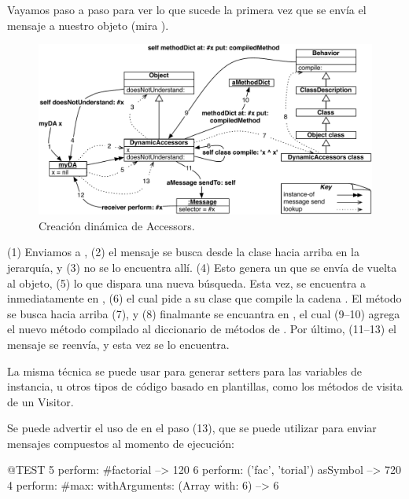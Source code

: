 \documentclass[a4paper,10pt,twoside]{book}
\begin{document}
Vayamos paso a paso para ver lo que sucede la primera vez que se envía
el mensaje  a nuestro objeto (mira ).

\begin{figure}[ht]\centering
        \includegraphics[width=\linewidth]{DynamicAccessors}
        \caption{Creaci\'on din\'amica de Accessors.}
\end{figure}

(1) Enviamos  a , (2) el mensaje se busca desde la
clase hacia arriba en la jerarquía, y (3) no se lo encuentra allí.
(4) Esto genera un  que se envía de
vuelta al objeto, (5) lo que dispara una nueva búsqueda.  Esta vez, se
encuentra a  inmediatamente en
, (6) el cual pide a su clase que compile la
cadena .  El método  se busca hacia arriba
(7), y (8) finalmante se encuantra en , el cual (9--10)
agrega el nuevo método compilado al diccionario de métodos de
.  Por último, (11--13) el mensaje se reenvía, y
esta vez se lo encuentra.

La misma técnica se puede usar para generar setters para las variables
de instancia, u otros tipos de código basado en plantillas, como los
métodos de visita de un Visitor.

Se puede advertir el uso de  en el paso
(13), que se puede utilizar para enviar mensajes compuestos al momento
de ejecución:
\begin{code}{@TEST}
5 perform: #factorial                                             --> 120
6 perform: ('fac', 'torial') asSymbol                       --> 720
4 perform: #max: withArguments: (Array with: 6) --> 6
\end{code}
\end{document}
